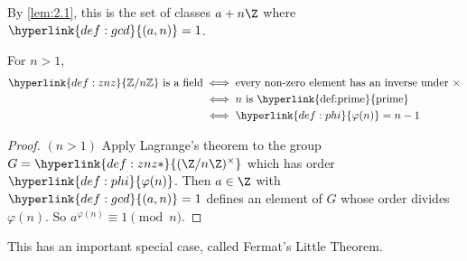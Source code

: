 \documentclass{article}
\begin{document}
By \cref{lem:2.1}, this is the set of classes $a + n \Z$ where $\hyperlink{def:gcd}{(a, n)} = 1$.

\begin{remark}
    For $n>1$,
    \begin{align*}
        \hyperlink{def:znz}{\mathbb{Z}/n\mathbb{Z}}\text{ is a field} & \iff \text{every non-zero element has an inverse under } \times \\
                                                                      &\iff n\text{ is \hyperlink{def:prime}{prime}} \\
                                                                      &\iff \hyperlink{def:phi}{\varphi(n)} = n-1
    \end{align*}
\end{remark}


\begin{proof}
    $(n>1)$ Apply Lagrange's theorem to the group $G = \hyperlink{def:znz*}{(\Z/n\Z)^\times}$ which has order $\hyperlink{def:phi}{\varphi(n)}$.
    Then $a \in \Z$ with $\hyperlink{def:gcd}{(a, n)} = 1$ defines an element of $G$ whose order divides $\varphi(n)$. So $a^{\varphi(n)} \equiv 1 \pmod{n}$.
\end{proof}

This has an important special case, called Fermat's Little Theorem.
\end{document}
